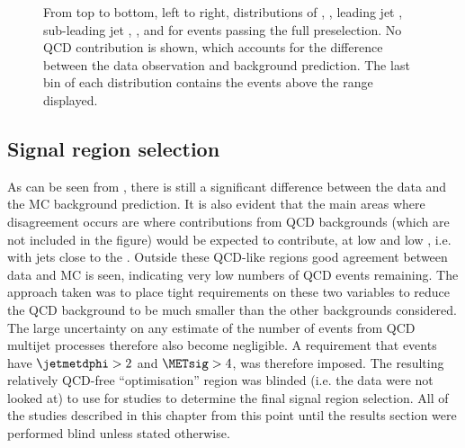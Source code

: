 \begin{figure}
  \caption{From top to bottom, left to right, distributions of \detajj, \Mjj, leading jet \pt, sub-leading jet \pt, \METnoMU, \METsig and \jetmetdphi for events passing the full preselection. No \ac{QCD} contribution is shown, which accounts for the difference between the data observation and background prediction. The last bin of each distribution contains the events above the range displayed.}
  \label{fig:parkedpostpresel}
\end{figure}




\subsection{Signal region selection}
\label{sec:parkedsigsel}
As can be seen from , there is still a significant difference between the data and the \ac{MC} background prediction. It is also evident that the main areas where disagreement occurs are where contributions from \ac{QCD} backgrounds (which are not included in the figure) would be expected to contribute, at low \METsig and low \jetmetdphi, i.e. with jets close to the \METnoMU. Outside these \ac{QCD}-like regions good agreement between data and \ac{MC} is seen, indicating very low numbers of \ac{QCD} events remaining. The approach taken was to place tight requirements on these two variables to reduce the \ac{QCD} background to be much smaller than the other backgrounds considered. The large uncertainty on any estimate of the number of events from \ac{QCD} multijet processes therefore also become negligible. A requirement that events have $\jetmetdphi>2$ and $\METsig>4$, was therefore imposed. The resulting relatively \ac{QCD}-free ``optimisation'' region was blinded (i.e. the data were not looked at) to use for studies to determine the final signal region selection. All of the studies described in this chapter from this point until the results section were performed blind unless stated otherwise.

